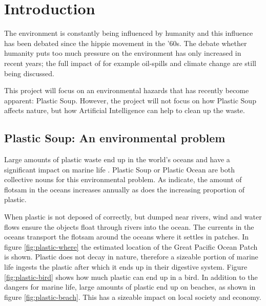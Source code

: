 \section{Introduction}
\label{sec:Introduction}
The environment is constantly being influenced by humanity and this influence has been debated since the hippie movement in the '60s.
The debate whether humanity puts too much pressure on the environment has only increased in recent years; the full impact of for example oil-spills and climate change are still being discussed.

This project will focus on an environmental hazards that has recently become apparent: Plastic Soup.
However, the project will not focus on how Plastic Soup affects nature, but how Artificial Intelligence can help to clean up the waste.



\subsection{Plastic Soup: An environmental problem}
\label{sec:Intro-Plastic Soup}
Large amounts of plastic waste end up in the world's oceans and have a significant impact on marine life \citep{barnes2005drifting}.
Plastic Soup or Plastic Ocean are both collective nouns for this environmental problem.
As \citeauthor{barnes2005drifting} indicate, the amount of flotsam in the oceans increases annually as does the increasing proportion of plastic.

When plastic is not deposed of correctly, but dumped near rivers, wind and water flows ensure the objects float through rivers into the ocean.
The currents in the oceans transport the flotsam around the oceans where it settles in patches.
In figure \ref{fig:plastic-where} the estimated location of the Great Pacific Ocean Patch is shown.
Plastic does not decay in nature, therefore a sizeable portion of marine life ingests the plastic after which it ends up in their digestive system. 
Figure \ref{fig:plastic-bird} shows how much plastic can end up in a bird.
In addition to the dangers for marine life, large amounts of plastic end up on beaches, as shown in figure \ref{fig:plastic-beach}.
This has a sizeable impact on local society and economy.

